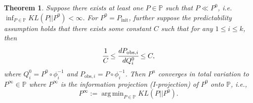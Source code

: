 \documentclass{article}
\newtheorem{theorem}{Theorem}[section]
\newcommand{\p}{\mathbb{P}}
\newcommand{\initmeas}{P_{\text{init}}}
\DeclareMathOperator*{\argmin}{arg\,min}
\begin{document}

\begin{theorem} \label{thm:main}
Suppose there exists at least one $P \in \p$ such that $P \ll P^{0}$, i.e. $\inf_{P \in \p} KL(P || P^{0}) < \infty$. 
For $P^0=\initmeas$, further suppose the predictability assumption holds that there exists some constant $C$ such that for any $1 \le i \le k$, then
\begin{equation*}
    \cfrac{1}{C} \le \cfrac{dP_{\text{obs},i}}{dQ^{0}_i} \le C,
\end{equation*}
where $Q^0_i = P^0\circ\phi^{-1}_i$ and $P_{\text{obs},i}=P\circ\phi_i^{-1}$. 
Then 
$P^{n}$ converges in total variation to $P^{\infty} \in \p$ where $P^{\infty}$ is the information projection (I-projection) of $P^{0}$ onto $\p$, i.e., 
\[
P^{\infty} := \argmin_{P \in \p} KL(P || P^{0}).
\]    
\end{theorem}
\end{document}
